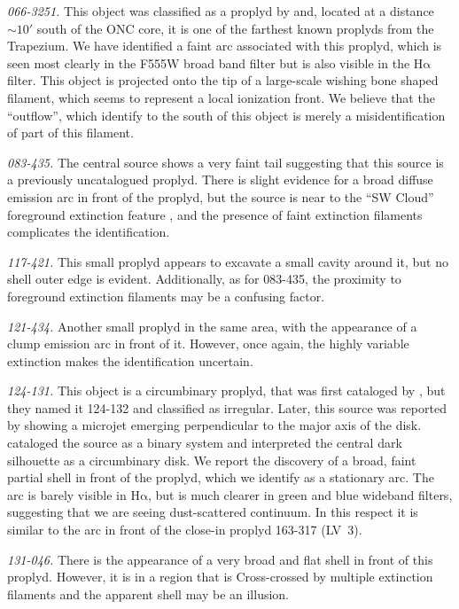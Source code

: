 \documentclass[apj, twocolumn]{aastex63}
\newcommand\ha{\ensuremath{\mathrm{H\alpha}}}
\begin{document}
\textit{066-3251.} This object was classified as a proplyd
by \citet{Ricci:2008a} and, located at a distance \(\sim 10'\)
south of the ONC core, it is one of the farthest known proplyds
from the Trapezium. We have identified a faint arc associated
with this proplyd, which is seen most clearly in the F555W broad
band filter but is also visible in the \ha{} filter. This object
is projected onto the tip of a large-scale wishing bone shaped
filament, which seems to represent a local ionization front.
We believe that the ``outflow'', which \citet{Ricci:2008a} identify
to the south of this object is merely a misidentification of
part of this filament.

\textit{083-435.} The central source shows a very faint tail
suggesting that this source is a previously uncatalogued proplyd.
There is slight evidence for a broad diffuse emission arc in front
of the proplyd, but the source is near to the ``SW Cloud'' foreground
extinction feature \citep{ODell:2000a}, and the presence of faint
extinction filaments complicates the identification.


\textit{117-421.} This small proplyd \citep{Ricci:2008a} appears to
excavate a small cavity around it, but no shell outer edge is
evident.  Additionally, as for 083-435, the proximity to foreground
extinction filaments may be a confusing factor. 

\textit{121-434.}  Another small proplyd in the same area, with the
appearance of a clump emission arc in front of it.  However, once
again, the highly variable extinction makes the identification
uncertain.

\textit{124-131.} This object is a circumbinary proplyd, that was
first cataloged by \citet{ODell:1996a}, but they named it 124-132 and
classified as irregular. Later, this source was reported by
\citet{Smith:2005a} showing a microjet emerging perpendicular to the
major axis of the disk. \citet{Ricci:2008a} cataloged the source as a
binary system and \citet{Robberto:2008a} interpreted the central dark
silhouette as a circumbinary disk.  We report the discovery of a
broad, faint partial shell in front of the proplyd, which we identify
as a stationary arc.  The arc is barely visible in \ha{}, but is much
clearer in green and blue wideband filters, suggesting that we are
seeing dust-scattered continuum.  In this respect it is similar to the
arc in front of the close-in proplyd 163-317 (LV~3).

\textit{131-046.}  There is the appearance of a very broad and flat
shell in front of this proplyd.  However, it is in a region that is
Cross-crossed by multiple extinction filaments and the apparent shell
may be an illusion.
\end{document}
